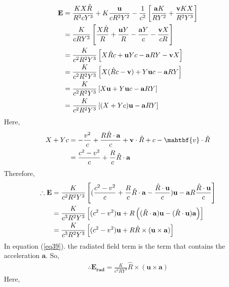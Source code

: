 \documentclass[11pt,a4paper]{article}
\begin{document}
\begin{align}
    \mathbf{E} &= \frac{KX\hat{R}}{R^2cY^3} + K\frac{\mathbf{u}}{cR^2Y^2} - \frac{1}{c^2}\left[\frac{\mathbf{a}K}{RY^2} + \frac{\mathbf{v}KX}{R^2Y^3}\right] \notag \\
               &= \frac{K}{cRY^3}\left[\frac{X\hat{R}}{R} + \frac{\mathbf{u}Y}{R} - \frac{\mathbf{a}Y}{c} - \frac{\mathbf{v}X}{cR}\right] \notag \\
               &= \frac{K}{c^2R^2Y^3}\left[ X\hat{R}c + \mathbf{u}Yc -\mathbf{a}RY - \mathbf{v}X \right] \notag \\
               &= \frac{K}{c^2R^2Y^3} \left[ X(\hat{R}c - \mathbf{v}) + Y \mathbf{u}c - \mathbf{a}RY \right] \notag \\
               &= \frac{K}{c^2R^2Y^3} \left[ X\mathbf{u} + Y\mathbf{u}c - \mathbf{a}RY \right] \notag \\
               &= \frac{K}{c^2R^2Y^3} \left[ (X + Yc)\mathbf{u} - \mathbf{a}RY \right] \label{eq38}
\end{align}
Here,
\begin{align*}
    X+Yc &= -\frac{v^2}{c} + \frac{R\hat{R}\cdot \mathbf{a}}{c} + \mathbf{v}\cdot \hat{R} + c - \mahtbf{v} \cdot \hat{R} \notag \\
         &= \frac{c^2-v^2}{c} + \frac{R}{c}\hat{R}\cdot \mathbf{a}
\end{align*}
Therefore,
\begin{align}
    \therefore \mathbf{E} &= \frac{K}{c^2R^2Y^3} \left[ (\frac{c^2 - v^2}{c} + \frac{R}{c}\hat{R}\cdot \mathbf{a} - \frac{\hat{R}\cdot \mathbf{u}}{c}) \mathbf{u} - \mathbf{a}R \frac{\hat{R}\cdot \mathbf{u}}{c} \right] \notag \\
                          &= \frac{K}{c^3R^2Y^3}\left[ (c^2-v^2)\mathbf{u} + R\left( (\hat{R}\cdot \mathbf{a})\mathbf{u} - (\hat{R}\cdot \mathbf{u})\mathbf{a} \right) \right] \notag \\
                          &= \frac{K}{c^3R^2Y^3}\left[ (c^2-v^2)\mathbf{u} + R \hat{R} \times (\mathbf{u}\times \mathbf{a})\right] \label{eq39}
\end{align}
In equation (\ref{eq39}). the radiated field term is the term that contains the acceleration $\mathbf{a}$. So,
\begin{align}
\therefore \boxed{\mathbf{E_{rad}} = \frac{K}{c^3RY^3} \hat{R}\times (\mathbf{u} \times \mathbf{a})} \label{eq40} 
\end{align}
\newpage
Here,
\end{document}
